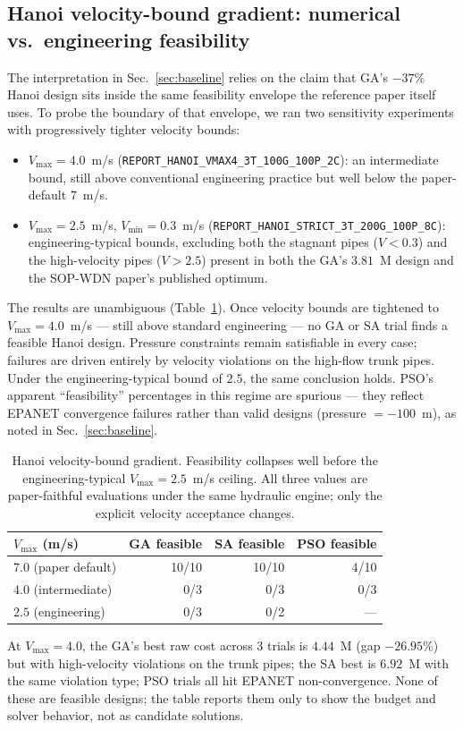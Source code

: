 \documentclass[conference]{IEEEtran}
\begin{document}
\subsection{Hanoi velocity-bound gradient: numerical vs.\ engineering feasibility}
\label{sec:hanoi-strict}
The interpretation in Sec.~\ref{sec:baseline} relies on the claim that GA's $-37\%$ Hanoi design sits inside the same feasibility envelope the reference paper itself uses. To probe the boundary of that envelope, we ran two sensitivity experiments with progressively tighter velocity bounds:

\begin{itemize}
\item $V_{\max}=4.0$~m/s (\texttt{REPORT\_HANOI\_VMAX4\_3T\_100G\_100P\_2C}): an intermediate bound, still above conventional engineering practice but well below the paper-default $7$~m/s.
\item $V_{\max}=2.5$~m/s, $V_{\min}=0.3$~m/s (\texttt{REPORT\_HANOI\_STRICT\_3T\_200G\_100P\_8C}): engineering-typical bounds, excluding both the stagnant pipes ($V<0.3$) and the high-velocity pipes ($V>2.5$) present in both the GA's $3.81$~M design and the SOP-WDN paper's published optimum.
\end{itemize}

The results are unambiguous (Table~\ref{tab:vmax_gradient}). Once velocity bounds are tightened to $V_{\max}=4.0$~m/s --- still above standard engineering --- no GA or SA trial finds a feasible Hanoi design. Pressure constraints remain satisfiable in every case; failures are driven entirely by velocity violations on the high-flow trunk pipes. Under the engineering-typical bound of $2.5$, the same conclusion holds. PSO's apparent ``feasibility'' percentages in this regime are spurious --- they reflect EPANET convergence failures rather than valid designs (pressure $=-100$~m), as noted in Sec.~\ref{sec:baseline}.

\begin{table}[t]
\caption{Hanoi velocity-bound gradient. Feasibility collapses well before the engineering-typical $V_{\max}=2.5$~m/s ceiling. All three values are paper-faithful evaluations under the same hydraulic engine; only the explicit velocity acceptance changes.}
\label{tab:vmax_gradient}
\centering
\begin{tabular}{lrrr}
\toprule
$V_{\max}$ (m/s) & GA feasible & SA feasible & PSO feasible \\
\midrule
$7.0$ (paper default) & 10/10 & 10/10 & 4/10 \\
$4.0$ (intermediate)  & 0/3   & 0/3   & 0/3 \\
$2.5$ (engineering)   & 0/3   & 0/2   & --- \\
\bottomrule
\end{tabular}

\smallskip
\noindent At $V_{\max}=4.0$, the GA's best raw cost across 3 trials is $4.44$~M (gap $-26.95\%$) but with high-velocity violations on the trunk pipes; the SA best is $6.92$~M with the same violation type; PSO trials all hit EPANET non-convergence. None of these are feasible designs; the table reports them only to show the budget and solver behavior, not as candidate solutions.
\end{table}
\end{document}
